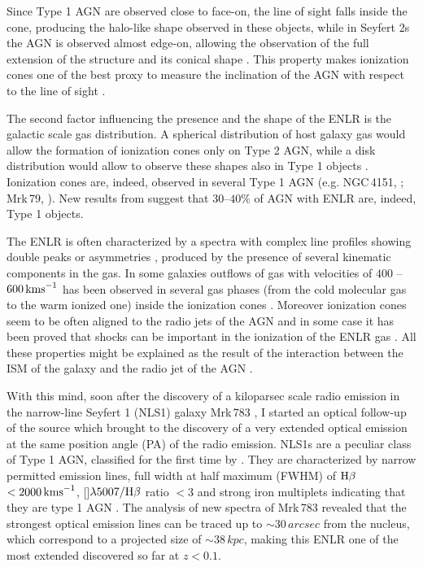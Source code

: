 \documentclass[../main.tex]{subfiles}
\begin{document}
Since Type 1 AGN are observed close to face-on, the line of sight falls inside the cone, producing the halo-like shape observed in these objects, while in Seyfert 2s the AGN is observed almost edge-on, allowing the observation of the full extension of the structure and its conical shape \citep{Schmitt03,Schmitt03b}.
This property makes ionization cones one of the best proxy to measure the inclination of the AGN with respect to the line of sight \citep{Fischer13,Marin14}.

The second factor influencing the presence and the shape of the ENLR is the galactic scale gas distribution. 
A spherical distribution of host galaxy gas would allow the formation of ionization cones only on Type 2 AGN, while a disk distribution would allow to observe these shapes also in Type 1 objects \citep{Mulchaey96b,Schmitt03b}.
Ionization cones are, indeed, observed in several Type 1 AGN (e.g. NGC\,4151, \cite{Pogge88}; Mrk\,79, \cite{Schmitt03}).
New results from \citet{He18} suggest that $30$--$40\%$ of AGN with ENLR are, indeed, Type 1 objects. 

The ENLR is often characterized by a spectra with complex line profiles showing double peaks or asymmetries \citep{Dietrich98,Morganti07,Ozaki09,Congiu17b}, produced by the presence of several kinematic components in the gas.
In some galaxies outflows of gas with velocities of $400$ -- $600\,\si{\kms}$ has been observed in several gas phases (from the cold molecular gas to the warm ionized one) inside the ionization cones \citep[e.g. IC\,5063][]{Baldwin87,Morganti98,Morganti07,Dasyra15,Morganti15}.
Moreover ionization cones seem to be often aligned to the radio jets of the AGN \citep{Unger87,Nagar99,Schmitt03,Schmitt03b} and in some case it has been proved that shocks can be important in the ionization of the ENLR gas \citep{Congiu17b,Rodriguez17}.
All these properties might be explained as the result of the interaction between the ISM of the galaxy and the radio jet of the AGN \citep[e.g.][]{Unger87,Tadhunter14,Congiu17b,Rodriguez17}.

With this mind, soon after the discovery of a kiloparsec scale radio emission in the narrow-line Seyfert 1 (NLS1) galaxy Mrk\,783 \citep{Congiu17}, I started an optical follow-up of the source which brought to the discovery of a very extended optical emission at the same position angle (PA) of the radio emission. 
NLS1s are a peculiar class of Type 1 AGN, classified for the first time by \citet{Osterbrock85}.
They are characterized by narrow permitted emission lines, full width at half maximum (FWHM) of $\Hb$ $<2000\,\si{\kms}$, []$\lambda5007/\Hb$ ratio $<3$ \citep{Osterbrock85} and strong iron multiplets indicating that they are type 1 AGN \citep{Goodrich89}.
The analysis of new spectra of Mrk\,783 \citep{Congiu17c} revealed that the strongest optical emission lines can be traced up to $\sim 30\,\si{arcsec}$ from the nucleus, which correspond to a projected size of $\sim 38\,\si{kpc}$, making this ENLR one of the most extended discovered so far at $z<0.1$.
\end{document}

